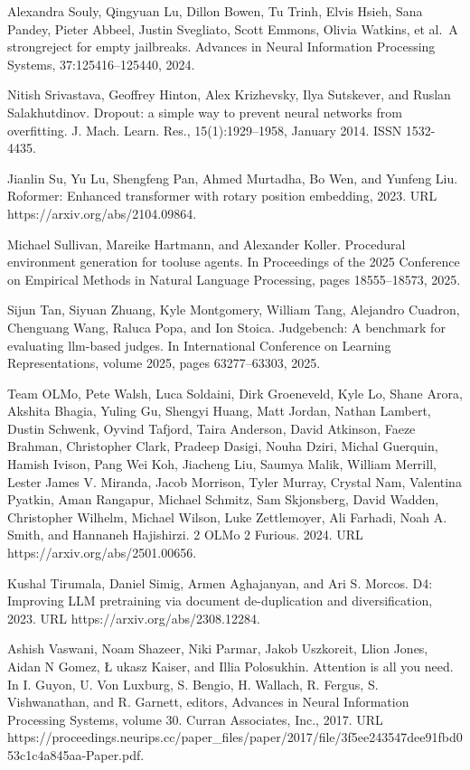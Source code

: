 \documentclass[
  10
]{article}
\begin{document}
Alexandra Souly, Qingyuan Lu, Dillon Bowen, Tu Trinh, Elvis Hsieh, Sana
Pandey, Pieter Abbeel, Justin Svegliato, Scott Emmons, Olivia Watkins,
et al.~A strongreject for empty jailbreaks. Advances in Neural
Information Processing Systems, 37:125416--125440, 2024.

Nitish Srivastava, Geoffrey Hinton, Alex Krizhevsky, Ilya Sutskever, and
Ruslan Salakhutdinov. Dropout: a simple way to prevent neural networks
from overfitting. J. Mach. Learn. Res., 15(1):1929--1958, January 2014.
ISSN 1532-4435.

Jianlin Su, Yu Lu, Shengfeng Pan, Ahmed Murtadha, Bo Wen, and Yunfeng
Liu. Roformer: Enhanced transformer with rotary position embedding,
2023. URL https://arxiv.org/abs/2104.09864.

Michael Sullivan, Mareike Hartmann, and Alexander Koller. Procedural
environment generation for tooluse agents. In Proceedings of the 2025
Conference on Empirical Methods in Natural Language Processing, pages
18555--18573, 2025.

Sijun Tan, Siyuan Zhuang, Kyle Montgomery, William Tang, Alejandro
Cuadron, Chenguang Wang, Raluca Popa, and Ion Stoica. Judgebench: A
benchmark for evaluating llm-based judges. In International Conference
on Learning Representations, volume 2025, pages 63277--63303, 2025.

Team OLMo, Pete Walsh, Luca Soldaini, Dirk Groeneveld, Kyle Lo, Shane
Arora, Akshita Bhagia, Yuling Gu, Shengyi Huang, Matt Jordan, Nathan
Lambert, Dustin Schwenk, Oyvind Tafjord, Taira Anderson, David Atkinson,
Faeze Brahman, Christopher Clark, Pradeep Dasigi, Nouha Dziri, Michal
Guerquin, Hamish Ivison, Pang Wei Koh, Jiacheng Liu, Saumya Malik,
William Merrill, Lester James V. Miranda, Jacob Morrison, Tyler Murray,
Crystal Nam, Valentina Pyatkin, Aman Rangapur, Michael Schmitz, Sam
Skjonsberg, David Wadden, Christopher Wilhelm, Michael Wilson, Luke
Zettlemoyer, Ali Farhadi, Noah A. Smith, and Hannaneh Hajishirzi. 2 OLMo
2 Furious. 2024. URL https://arxiv.org/abs/2501.00656.

Kushal Tirumala, Daniel Simig, Armen Aghajanyan, and Ari S. Morcos. D4:
Improving LLM pretraining via document de-duplication and
diversification, 2023. URL https://arxiv.org/abs/2308.12284.

Ashish Vaswani, Noam Shazeer, Niki Parmar, Jakob Uszkoreit, Llion Jones,
Aidan N Gomez, Ł ukasz Kaiser, and Illia Polosukhin. Attention is all
you need. In I. Guyon, U. Von Luxburg, S. Bengio, H. Wallach, R. Fergus,
S. Vishwanathan, and R. Garnett, editors, Advances in Neural Information
Processing Systems, volume 30. Curran Associates, Inc., 2017. URL
https://proceedings.neurips.cc/paper\_files/paper/2017/file/3f5ee243547dee91fbd053c1c4a845aa-Paper.pdf.
\end{document}
